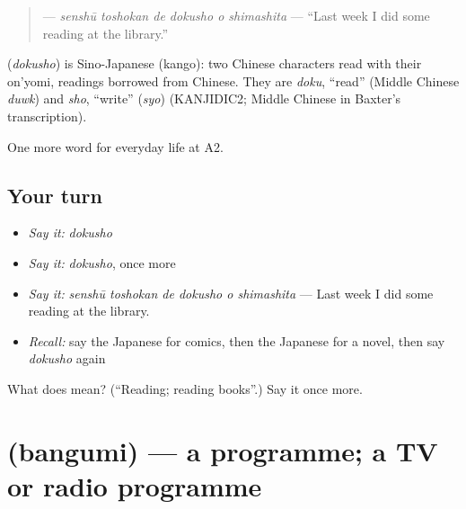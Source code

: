 \begin{quote}
\textbf{   } — \emph{senshū toshokan de dokusho o shimashita} — \textquotedblleft{}Last week I did some reading at the library.\textquotedblright{}
\end{quote}

\begin{cousinweb}
\textbf{} (\emph{dokusho}) is Sino-Japanese (kango): two Chinese characters read with their on'yomi, readings borrowed from Chinese. They are \emph{doku}, \textquotedblleft{}read\textquotedblright{} (Middle Chinese \emph{duwk}) and \emph{sho}, \textquotedblleft{}write\textquotedblright{} (\emph{syo}) (KANJIDIC2; Middle Chinese in Baxter's transcription).
\end{cousinweb}

\begin{grammarlens}[title={What you've built}]
One more word for everyday life at A2.
\end{grammarlens}

\subsection*{Your turn}
\begin{itemize}
\raggedright
  \item \emph{Say it:} \emph{dokusho}
  \item \emph{Say it:} \emph{dokusho}, once more
  \item \emph{Say it:} \emph{senshū toshokan de dokusho o shimashita} — Last week I did some reading at the library.
  \item \emph{Recall:} say the Japanese for comics, then the Japanese for a novel, then say \emph{dokusho} again
\end{itemize}

\begin{tcolorbox}[breakable,colback=teal!4,colframe=teal!35!black,title={Before you move on}]
What does  mean? (\textquotedblleft{}Reading; reading books\textquotedblright{}.) Say it once more.
\end{tcolorbox}
\section[\texorpdfstring{\ja{ばんぐみ} (bangumi)}{ばんぐみ (bangumi)}]{ (bangumi) — a programme; a TV or radio programme}

\label{lesson:JA-C238-bangumi}



